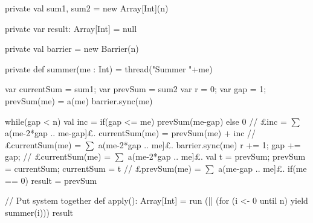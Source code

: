 \begin{answerI}
\begin{scala}
{  private val sum1, sum2 = new Array[Int](n) 

  private var result: Array[Int] = null

  private val barrier = new Barrier(n)

  private def summer(me : Int) = thread("Summer "+me){
    var currentSum = sum1; var prevSum = sum2
    var r = 0; var gap = 1; prevSum(me) = a(me)
    barrier.sync(me)

    while(gap < n){ 
      val inc = if(gap <= me) prevSum(me-gap) else 0  
      // £inc = $\sum$ a(me-2*gap .. me-gap]£.
      currentSum(me) = prevSum(me) + inc 
      // £currentSum(me) = $\sum$ a(me-2*gap .. me]£.
      barrier.sync(me)
      r += 1; gap += gap;        // £currentSum(me) = $\sum$ a(me-2*gap .. me]£.
      val t = prevSum; prevSum = currentSum; currentSum = t 
      // £prevSum(me) = $\sum$ a(me-gap .. me]£.
    }
    if(me == 0) result = prevSum
  }

  // Put system together
  def apply(): Array[Int] = {
    run (|| (for (i <- 0 until n) yield summer(i)))
    result
  }
}
\end{scala}
\end{answerI}
